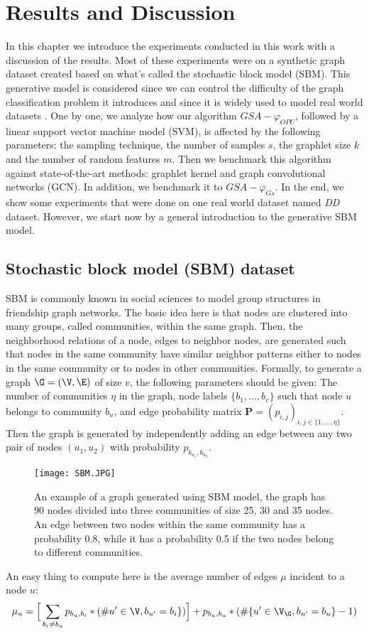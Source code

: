 \addchapheadtotoc
\chapter{Results and Discussion}
In this chapter we introduce the experiments conducted in this work  with a discussion of the results. Most of these experiments were on a synthetic graph dataset created based on what's called the stochastic block model (SBM). This generative model is considered since we can control the difficulty of the graph classification problem it introduces and since it is widely used to model real world datasets \citep{SBM}. \newline
One by one, we analyze how our algorithm $GSA-\varphi_{OPU}$, followed by a linear support vector machine model (SVM), is affected by the following parameters: the sampling technique, the number of samples $s$, the graphlet size $k$ and the number of random features $m$.
Then we benchmark this algorithm against state-of-the-art methods: graphlet kernel and graph convolutional networks (GCN). In addition, we benchmark it to $GSA-\varphi_{Gs}$.
In the end, we show some experiments that were done on one real world dataset named \emph{DD} dataset. However, we start now by a general introduction to the generative SBM model. 
\section{Stochastic block model (SBM) dataset}
SBM is commonly known in social sciences to model group structures in friendship graph networks\citep{SBM}. The basic idea here is that nodes  are clustered into many groups, called communities, within the same graph. Then, the neighborhood relations of a node, edges to neighbor nodes, are generated such that nodes in the same community have similar neighbor patterns either to nodes in the same community or to nodes in other communities. \newline
Formally, to generate a graph $\G=(\V,\E)$ of size $v$, the following parameters should be given: The number of communities $\eta$ in the graph, node labels $\{b_1 , \ldots ,b_v\}$ such that node $u$ belongs to community $b_u$, and edge probability matrix $\mathbf{P}=(p_{i,j})_{i,j\in\{1,\ldots, \eta\}}$.
Then the graph is generated by independently adding an edge between any two pair of nodes $(u_1,u_2)$ with probability $p_{b_{u_1} , b_{u_2}}$. \newline
\begin{figure}[H]
\centering
\texttt{[image: SBM.JPG]}
\caption[Visualization of an SBM-based graph example]{An example of a graph generated using SBM model, the graph has 90 nodes divided into three communities of size 25, 30 and 35 nodes. An edge between two nodes within the same community has a probability 0.8, while it has a probability 0.5 if the two nodes belong to different communities.}
\label{fig:SBM_example}
\end{figure}
An easy thing to compute here is the average number of edges $\mu$ incident to a node $u$:
\begin{equation}
    \mu_u=\Big[\sum_{b_i\neq b_u} p_{b_u,b_i}*(\#u'\in \V, b_{u'}=b_i \} )\Big]+p_{b_u,b_u}*(\#\{u'\in \V_\G, b_{u'}=b_u \}-1 )
\end{equation}
